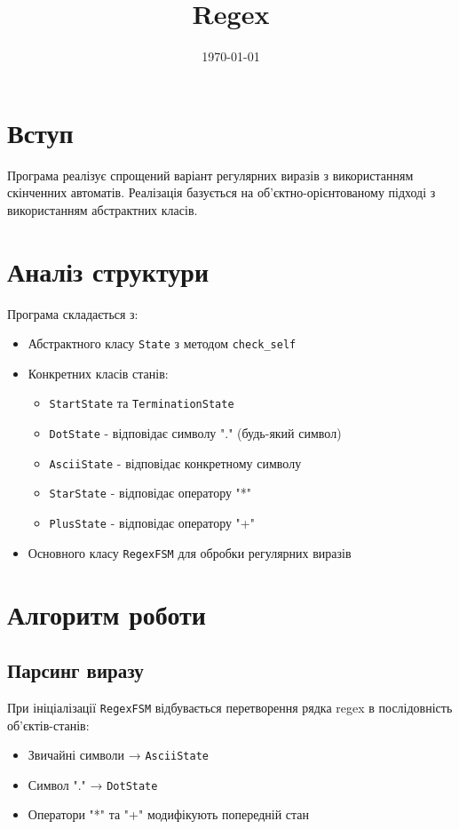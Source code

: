 \documentclass{article}
\title{Regex}
\author{}
\date{\today}
\begin{document}
\maketitle

\section{Вступ}
Програма реалізує спрощений варіант регулярних виразів з використанням скінченних автоматів. Реалізація базується на об'єктно-орієнтованому підході з використанням абстрактних класів.

\section{Аналіз структури}
Програма складається з:
\begin{itemize}
  \item Абстрактного класу \texttt{State} з методом \texttt{check\_self}
  \item Конкретних класів станів:
    \begin{itemize}
      \item \texttt{StartState} та \texttt{TerminationState}
      \item \texttt{DotState} - відповідає символу "." (будь-який символ)
      \item \texttt{AsciiState} - відповідає конкретному символу
      \item \texttt{StarState} - відповідає оператору "*"
      \item \texttt{PlusState} - відповідає оператору "+"
    \end{itemize}
  \item Основного класу \texttt{RegexFSM} для обробки регулярних виразів
\end{itemize}

\section{Алгоритм роботи}
\subsection{Парсинг виразу}
При ініціалізації \texttt{RegexFSM} відбувається перетворення рядка regex в послідовність об'єктів-станів:
\begin{itemize}
  \item Звичайні символи → \texttt{AsciiState}
  \item Символ "." → \texttt{DotState}
  \item Оператори "*" та "+" модифікують попередній стан
\end{itemize}
\end{document}
